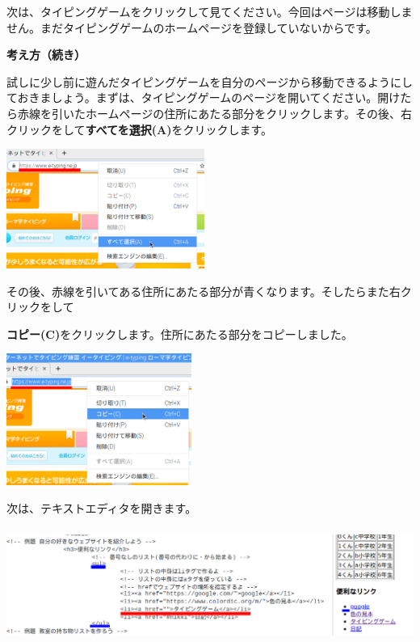\documentclass[a4paper,12pt]{jarticle}
\begin{document}
\bigskip

\flushleft
次は、タイピングゲームをクリックして見てください。今回はページは移動しません。まだタイピングゲームのホームページを登録していないからです。


\clearpage
\textbf{考え方（続き）}



試しに少し前に遊んだタイピングゲームを自分のページから移動できるようにしておきましょう。まずは、タイピングゲームのページを開いてください。開けたら赤線を引いたホームページの住所にあたる部分をクリックします。その後、右クリックをして\textbf{すべてを選択(A)}をクリックします。


\bigskip

\centering
\includegraphics[width=6.495cm,height=3.914cm]{textbook-img196.png}

\flushleft

その後、赤線を引いてある住所にあたる部分が青くなります。そしたらまた右クリックをして

\textbf{コピー(C)}をクリックします。住所にあたる部分をコピーしました。

\centering
\includegraphics[width=6.064cm,height=4.311cm]{textbook-img197.png}

\bigskip
\flushleft

次は、テキストエディタを開きます。

\centering
\includegraphics[width=15.157cm,height=3.755cm]{textbook-img198.png}
\end{document}
